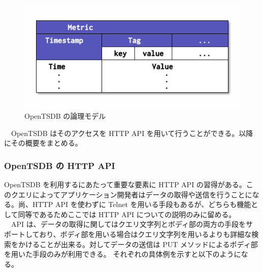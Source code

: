 \documentclass{scrartcl}
\begin{document}
\begin{figure}[htbp]
\centering
\includegraphics[width=12cm]{hoge4.png}
\caption{OpenTSDB の論理モデル}
\end{figure}

　OpenTSDB はそのアクセスを HTTP API を用いて行うことができる。以降にその概要をまとめる。\\

\subsubsection{OpenTSDB の HTTP API}
\label{sec:org9d23e44}
OpenTSDB を利用するにあたって重要な要素に HTTP API の習得がある。このクエリによってアプリケーション開発者はデータの取得や送信を行うことになる。尚、HTTP API を使わずに Telnet を用いる手段もあるが、どちらも機能として同等であるためここでは HTTP API についての説明のみに留める。\\
　API は、データの取得に関してはクエリ文字列とボディ部の両方の手段をサポートしており、ボディ部を用いる場合はクエリ文字列を用いるよりも詳細な検索をかけることが出来る。対してデータの送信は PUT メソッドによるボディ部を用いた手段のみが利用できる。 それぞれの具体例を示すと以下のようになる。\\
\end{document}
